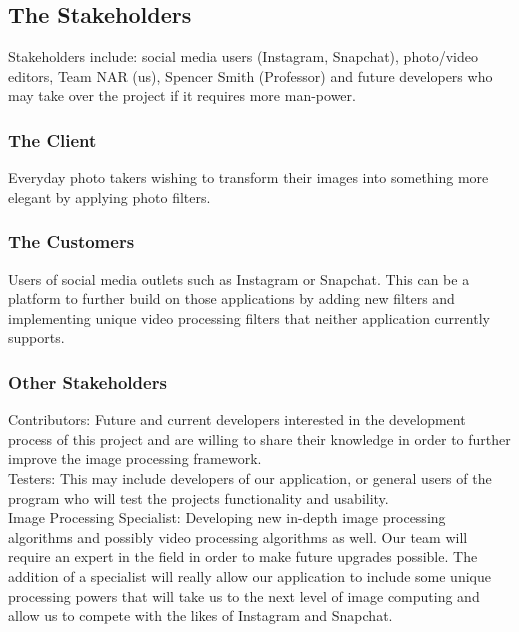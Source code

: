 \documentclass[12pt, titlepage]{article}
\begin{document}
\subsection{The Stakeholders}

Stakeholders include: social media users (Instagram, Snapchat), photo/video editors, Team NAR (us), Spencer Smith (Professor) and future developers who may take over the project if it requires more man-power.

\subsubsection{The Client}

Everyday photo takers wishing to transform their images into something more elegant by applying photo filters. 

\subsubsection{The Customers}

Users of social media outlets such as Instagram or Snapchat. This can be a platform to further build on those applications by adding new filters and implementing unique video processing filters that neither application currently supports. 

\subsubsection{Other Stakeholders}


Contributors: Future and current developers interested in the development process of this project and are willing to share their knowledge in order to further improve the image processing framework.\\

Testers: This may include developers of our application, or general users of the program who will test the projects functionality and usability.\\

Image Processing Specialist: Developing new in-depth image processing algorithms and possibly video processing algorithms as well. Our team will require an expert in the field in order to make future upgrades possible. The addition of a specialist will really allow our application to include some unique processing powers that will take us to the next level of image computing and allow us to compete with the likes of Instagram and Snapchat.
\end{document}
